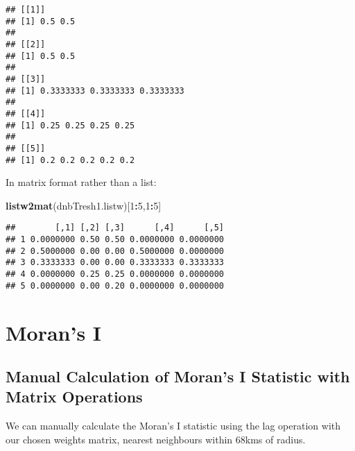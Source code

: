 \documentclass[
]{book}
\newenvironment{Shaded}{\begin{snugshade}}{\end{snugshade}}
\newcommand{\DecValTok}[1]{\textcolor[rgb]{0.00,0.00,0.81}{#1}}
\newcommand{\KeywordTok}[1]{\textcolor[rgb]{0.13,0.29,0.53}{\textbf{#1}}}
\newcommand{\NormalTok}[1]{#1}
\newcommand{\OperatorTok}[1]{\textcolor[rgb]{0.81,0.36,0.00}{\textbf{#1}}}
\newcommand{\StringTok}[1]{\textcolor[rgb]{0.31,0.60,0.02}{#1}}
\begin{document}
\begin{verbatim}
## [[1]]
## [1] 0.5 0.5
## 
## [[2]]
## [1] 0.5 0.5
## 
## [[3]]
## [1] 0.3333333 0.3333333 0.3333333
## 
## [[4]]
## [1] 0.25 0.25 0.25 0.25
## 
## [[5]]
## [1] 0.2 0.2 0.2 0.2 0.2
\end{verbatim}

In matrix format rather than a list:

\begin{Shaded}
\begin{Highlighting}[]
\KeywordTok{listw2mat}\NormalTok{(dnbTresh1.listw)[}\DecValTok{1}\OperatorTok{:}\DecValTok{5}\NormalTok{,}\DecValTok{1}\OperatorTok{:}\DecValTok{5}\NormalTok{]}
\end{Highlighting}
\end{Shaded}

\begin{verbatim}
##        [,1] [,2] [,3]      [,4]      [,5]
## 1 0.0000000 0.50 0.50 0.0000000 0.0000000
## 2 0.5000000 0.00 0.00 0.5000000 0.0000000
## 3 0.3333333 0.00 0.00 0.3333333 0.3333333
## 4 0.0000000 0.25 0.25 0.0000000 0.0000000
## 5 0.0000000 0.00 0.20 0.0000000 0.0000000
\end{verbatim}

\hypertarget{morans-i}{%
\section{Moran's I}\label{morans-i}}

\hypertarget{manual-calculation-of-morans-i-statistic-with-matrix-operations}{%
\subsection{Manual Calculation of Moran's I Statistic with Matrix Operations}\label{manual-calculation-of-morans-i-statistic-with-matrix-operations}}

We can manually calculate the Moran's I statistic using the lag operation with our chosen weights matrix, nearest neighbours within 68kms of radius.

\begin{Shaded}
\end{Shaded}
\end{document}

